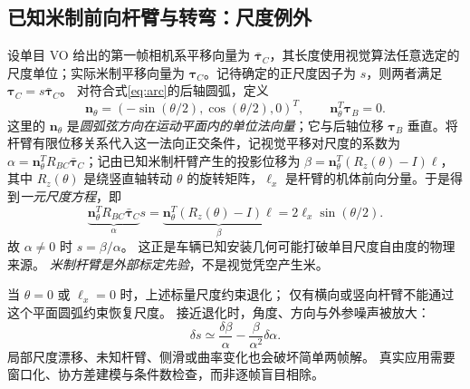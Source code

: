 \documentclass[UTF8,a4paper,fontset=fandol,11pt]{ctexart}
\newcommand{\vct}[1]{\bm #1}
\begin{document}
\subsection{已知米制前向杆臂与转弯：尺度例外}
设单目 VO 给出的第一帧相机系平移向量为 $\bar{\vct\tau}_C$，其长度使用视觉算法任意选定的尺度单位；实际米制平移向量为 $\vct\tau_C$。记待确定的正尺度因子为 $s$，则两者满足 $\vct\tau_C=s\bar{\vct\tau}_C$。
对符合式\eqref{eq:arc}的后轴圆弧，定义
\begin{equation}
 \vct n_\theta=(-\sin(\theta/2),\cos(\theta/2),0)^T,
 \qquad \vct n_\theta^T\vct\tau_B=0.
\end{equation}
这里的 $\vct n_\theta$ 是\emph{圆弧弦方向在运动平面内的单位法向量}；它与后轴位移 $\vct\tau_B$ 垂直。将杆臂有限位移关系代入这一法向正交条件，记视觉平移对尺度的系数为 $\alpha=\vct n_\theta^T R_{BC}\bar{\vct\tau}_C$；记由已知米制杆臂产生的投影位移为 $\beta=\vct n_\theta^T(R_z(\theta)-I)\vct\ell$，其中 $R_z(\theta)$ 是绕竖直轴转动 $\theta$ 的旋转矩阵，$\ell_x$ 是杆臂的机体前向分量。于是得到\emph{一元尺度方程}，即
\begin{equation}\label{eq:carscale}
 \underbrace{\vct n_\theta^T R_{BC}\bar{\vct\tau}_C}_{\alpha}s
 =\underbrace{\vct n_\theta^T(R_z(\theta)-I)\vct\ell}_{\beta}
 =2\ell_x\sin(\theta/2).
\end{equation}
故 $\alpha\ne0$ 时 $s=\beta/\alpha$。
这正是车辆已知安装几何可能打破单目尺度自由度的物理来源\cite{absolutescale}。
\emph{米制杆臂是外部标定先验}，不是视觉凭空产生米。

当 $\theta=0$ 或 $\ell_x=0$ 时，上述标量尺度约束退化；
仅有横向或竖向杆臂不能通过这个平面圆弧约束恢复尺度。
接近退化时，角度、方向与外参噪声被放大：
\begin{equation}
 \delta s\simeq\frac{\delta\beta}{\alpha}
 -\frac{\beta}{\alpha^2}\delta\alpha.
\end{equation}
局部尺度漂移、未知杆臂、侧滑或曲率变化也会破坏简单两帧解。
真实应用需要窗口化、协方差建模与条件数检查，而非逐帧盲目相除。
\end{document}
